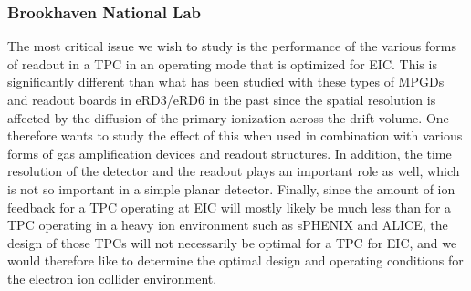 \subsubsection{Brookhaven National Lab} 
The most critical issue we wish to study is the performance of the various forms of readout in a TPC in an operating mode that is optimized for EIC. This is significantly different than what has been studied with these types of MPGDs and readout boards in eRD3/eRD6 in the past since the spatial resolution is affected by the diffusion of the primary ionization across the drift volume. One therefore wants to study the effect of this when used in combination with various forms of gas amplification devices and readout structures. In addition, the time resolution of the detector and the readout plays an important role as well, which is not so important in a simple planar detector. Finally, since the amount of ion feedback for a TPC operating at EIC will mostly likely be much less than for a TPC operating in a heavy ion environment such as sPHENIX and ALICE, the design of those TPCs will not necessarily be optimal for a TPC for EIC, and we would therefore like to determine the optimal design and operating conditions for the electron ion collider environment. 